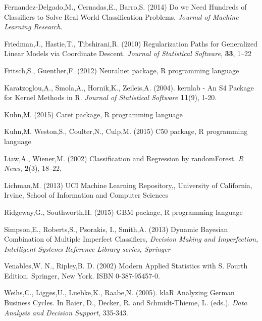\documentclass{document}
\begin{document}
\clearpage


\vspace{-4mm}
\begin{thebibliography}{9}

Fernandez-Delgado,M., Cernadas,E., Barro,S. (2014) Do we Need Hundreds of Classifiers to Solve Real World Classification Problems, {\it Journal of Machine Learning Research}.

Friedman,J., Hastie,T., Tibshirani,R. (2010) Regularization Paths for Generalized Linear Models via Coordinate Descent. \textit{Journal of Statistical Software}, \textbf{33}, 1--22 

Fritsch,S., Guenther,F. (2012) Neuralnet package, R programming language

Karatzoglou,A., Smola,A., Hornik,K., Zeileis,A. (2004). kernlab - An S4 Package for Kernel Methods in R. \textit{Journal of Statistical Software} \textbf{11}(9), 1-20. 

Kuhn,M. (2015) Caret package, R programming language 

Kuhn,M. Weston,S., Coulter,N., Culp,M. (2015) C50 package, R programming language

Liaw,A., Wiener,M. (2002) Classification and Regression by randomForest. \textit{R News}, \textbf{2}(3), 18--22, 

Lichman,M. (2013) UCI Machine Learning Repository,, University of California, Irvine, School of Information and Computer Sciences

Ridgeway,G., Southworth,H. (2015) GBM package, R programming language

Simpson,E., Roberts,S., Psorakis, I., Smith,A. (2013) Dynamic Bayesian Combination of Multiple Imperfect Classifiers, {\it Decision Making and Imperfection, Intelligent Systems Reference Library series, Springer}

Venables,W. N., Ripley,B. D. (2002) Modern Applied Statistics with S. Fourth Edition. Springer, New York. ISBN 0-387-95457-0. 

Weihs,C., Ligges,U., Luebke,K., Raabe,N. (2005). klaR Analyzing German Business Cycles. In Baier, D., Decker, R. and Schmidt-Thieme, L. (eds.). \textit{Data Analysis and Decision Support}, 335-343.


\end{thebibliography}
\end{document}
